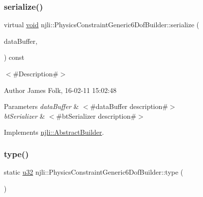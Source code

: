 \subsubsection{\texorpdfstring{serialize()}{serialize()}}
{\footnotesize\ttfamily virtual \mbox{\hyperlink{_thread_8h_af1e856da2e658414cb2456cb6f7ebc66}{void}} njli\+::\+Physics\+Constraint\+Generic6\+Dof\+Builder\+::serialize (\begin{DoxyParamCaption}\item[{\mbox{\hyperlink{_thread_8h_af1e856da2e658414cb2456cb6f7ebc66}{void}} $\ast$}]{data\+Buffer,  }\item[{bt\+Serializer $\ast$}]{ }\end{DoxyParamCaption}) const\hspace{0.3cm}{\ttfamily [virtual]}}



$<$\#\+Description\#$>$ 

\begin{DoxyAuthor}{Author}
James Folk, 16-\/02-\/11 15\+:02\+:48
\end{DoxyAuthor}

\begin{DoxyParams}{Parameters}
{\em data\+Buffer} & $<$\#data\+Buffer description\#$>$ \\
\hline
{\em bt\+Serializer} & $<$\#bt\+Serializer description\#$>$ \\
\hline
\end{DoxyParams}


Implements \mbox{\hyperlink{classnjli_1_1_abstract_builder_ab66b774e02ccb9da554c9aab7fa6d981}{njli\+::\+Abstract\+Builder}}.

\mbox{\label{classnjli_1_1_physics_constraint_generic6_dof_builder_a834578ee471490e8b274e22cf21642fb}} 
\subsubsection{\texorpdfstring{type()}{type()}}
{\footnotesize\ttfamily static \mbox{\hyperlink{_util_8h_a10e94b422ef0c20dcdec20d31a1f5049}{u32}} njli\+::\+Physics\+Constraint\+Generic6\+Dof\+Builder\+::type (\begin{DoxyParamCaption}{ }\end{DoxyParamCaption})\hspace{0.3cm}{\ttfamily [static]}}

